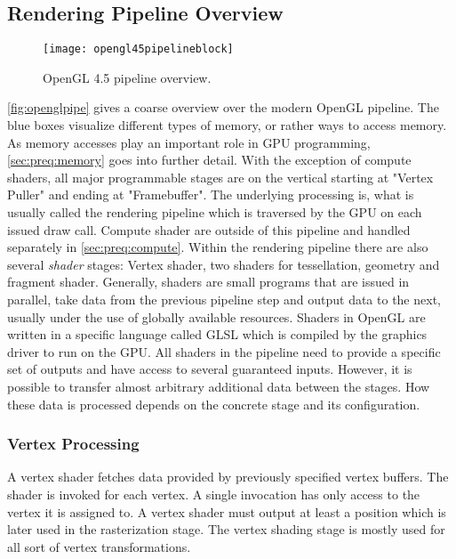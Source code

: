 \documentclass[thesis.tex]{subfiles}
\begin{document}
\subsection{Rendering Pipeline Overview}
\begin{figure}[h]
\centering
\texttt{[image: opengl45pipelineblock]}
\caption{\cite{bib:openglspec} OpenGL 4.5 pipeline overview.}
\label{fig:openglpipe}
\end{figure}
\autoref{fig:openglpipe} gives a coarse overview over the modern OpenGL pipeline.
The blue boxes visualize different types of memory, or rather ways to access memory.
As memory accesses play an important role in GPU programming, \autoref{sec:preq:memory} goes into further detail.
With the exception of compute shaders, all major programmable stages are on the vertical starting at "Vertex Puller" and ending at "Framebuffer".
The underlying processing is, what is usually called the rendering pipeline which is traversed by the GPU on each issued draw call.
Compute shader are outside of this pipeline and handled separately in \autoref{sec:preq:compute}.
Within the rendering pipeline there are also several \emph{shader} stages: Vertex shader, two shaders for tessellation, geometry and fragment shader.
Generally, shaders are small programs that are issued in parallel, take data from the previous pipeline step and output data to the next, usually under the use of globally available resources.
Shaders in OpenGL are written in a specific language called GLSL which is compiled by the graphics driver to run on the GPU.
All shaders in the pipeline need to provide a specific set of outputs and have access to several guaranteed inputs.
However, it is possible to transfer almost arbitrary additional data between the stages.
How these data is processed depends on the concrete stage and its configuration.

\subsubsection{Vertex Processing}
A vertex shader fetches data provided by previously specified vertex buffers.
The shader is invoked for each vertex.
A single invocation has only access to the vertex it is assigned to.
A vertex shader must output at least a position which is later used in the rasterization stage.
The vertex shading stage is mostly used for all sort of vertex transformations.
\end{document}
